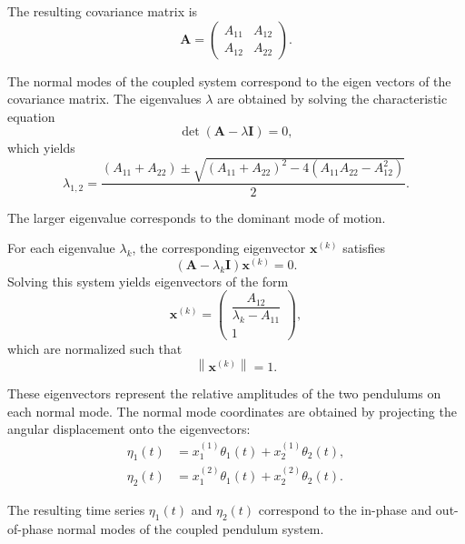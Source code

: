 \documentclass[reprint,amsmath,amssymb,aps,prb,footinbib,floatfix]{revtex4-2}
\begin{document}
The resulting covariance matrix is 
\begin{equation}
\mathbf{A} =
\begin{pmatrix}
A_{11} & A_{12} \\
A_{12} & A_{22}
\end{pmatrix}.
\end{equation}

The normal modes of the coupled system correspond to the eigen vectors of the covariance matrix. The eigenvalues $\lambda$ are obtained by solving the characteristic equation 
\begin{equation}
\det(\mathbf{A} - \lambda \mathbf{I}) = 0,
\end{equation}
which yields
\begin{equation}
\lambda_{1,2} =
\frac{(A_{11} + A_{22}) \pm
\sqrt{(A_{11} + A_{22})^2 - 4(A_{11}A_{22} - A_{12}^2)}}{2}.
\end{equation}

The larger eigenvalue corresponds to the dominant mode of motion.

For each eigenvalue $\lambda_k$, the corresponding eigenvector $\mathbf{x}^{(k)}$ satisfies
\begin{equation}
(\mathbf{A} - \lambda_k \mathbf{I})\mathbf{x}^{(k)} = 0.
\end{equation}
Solving this system yields eigenvectors of the form
\begin{equation}
\mathbf{x}^{(k)} =
\begin{pmatrix}
\dfrac{A_{12}}{\lambda_k - A_{11}} \\
1
\end{pmatrix},
\end{equation}
which are normalized such that
\begin{equation}
\left\lVert \mathbf{x}^{(k)} \right\rVert = 1.
\end{equation} 

These eigenvectors represent the relative amplitudes of the two pendulums on each normal mode. The normal mode coordinates are obtained by projecting the angular displacement onto the eigenvectors: 
\begin{align}
\eta_1(t) &= x_1^{(1)}\theta_1(t) + x_2^{(1)}\theta_2(t), \\
\eta_2(t) &= x_1^{(2)}\theta_1(t) + x_2^{(2)}\theta_2(t).
\end{align}

The resulting time series $\eta_1(t)$ and $\eta_2(t)$ correspond to the in-phase and out-of-phase normal modes of the coupled pendulum system.
\end{document}
